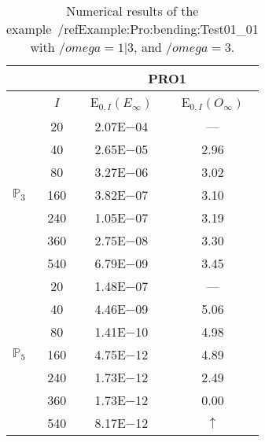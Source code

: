 \begin{table}[H]
\caption{Numerical results of the example~/ref{Example:Pro:bending:Test01_01} with $/omega=1|3$, and $/omega=3$.}
\setlength{\tabcolsep}{5pt}
\centering
\begin{tabular}{@{}l c c c@{}}
\toprule
 &  & \multicolumn{2}{c}{PRO1}\\
\midrule
 & $I$ & E$_{0,I}(E_{\infty})$ & E$_{0,I}(O_{\infty})$\\
\midrule
\multirow{7}{*}{$\mathbb{P}_{3}$}
 & 20 & 2.07E$-$04 & ---\\
 & 40 & 2.65E$-$05 & 2.96\\
 & 80 & 3.27E$-$06 & 3.02\\
 & 160 & 3.82E$-$07 & 3.10\\
 & 240 & 1.05E$-$07 & 3.19\\
 & 360 & 2.75E$-$08 & 3.30\\
 & 540 & 6.79E$-$09 & 3.45\\
\midrule
\multirow{7}{*}{$\mathbb{P}_{5}$}
 & 20 & 1.48E$-$07 & ---\\
 & 40 & 4.46E$-$09 & 5.06\\
 & 80 & 1.41E$-$10 & 4.98\\
 & 160 & 4.75E$-$12 & 4.89\\
 & 240 & 1.73E$-$12 & 2.49\\
 & 360 & 1.73E$-$12 & 0.00\\
 & 540 & 8.17E$-$12 & $\uparrow$\\
\bottomrule
\end{tabular}
\label{Table:PRO:test_01_01_test7_pro1}
\end{table}
